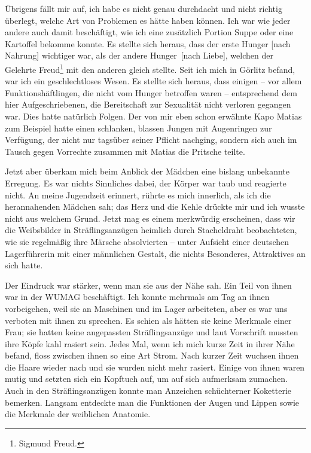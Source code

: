 \documentclass[a4paper,12pt,ngerman,
]{nisebook}
\begin{document}
Übrigens fällt mir auf, ich habe es nicht genau durchdacht und nicht richtig überlegt, welche Art von Problemen es hätte haben können. Ich war wie jeder andere auch damit beschäftigt, wie ich eine zusätzlich Portion Suppe oder eine Kartoffel bekomme konnte. Es stellte sich heraus, dass der erste Hunger [nach Nahrung] wichtiger war, als der andere \glqq Hunger\grqq~[nach Liebe], welchen der Gelehrte Freud\footnote{Sigmund Freud.} mit den anderen gleich stellte. Seit ich mich in Görlitz befand, war ich ein geschlechtloses Wesen. Es stellte sich heraus, dass einigen -- vor allem Funktionshäftlingen, die nicht vom Hunger betroffen waren -- entsprechend dem hier Aufgeschriebenen, die Bereitschaft zur Sexualität nicht verloren gegangen war. Dies hatte natürlich Folgen. Der von mir eben schon erwähnte Kapo Matias zum Beispiel hatte einen schlanken, blassen Jungen mit Augenringen zur Verfügung, der nicht nur tagsüber seiner Pflicht nachging, sondern sich auch im Tausch gegen Vorrechte zusammen mit Matias die Pritsche teilte.

Jetzt aber überkam mich beim Anblick der Mädchen eine bislang unbekannte Erregung. Es war nichts Sinnliches dabei, der Körper war taub und reagierte nicht. An meine Jugendzeit erinnert, rührte es mich innerlich, als ich die herannahenden Mädchen sah; das Herz und die Kehle drückte mir und ich wusste nicht aus welchem Grund. Jetzt mag es einem merkwürdig erscheinen, dass wir die Weibsbilder in Sträflingsanzügen heimlich durch Stacheldraht beobachteten, wie sie regelmäßig ihre Märsche absolvierten -- unter Aufsicht einer deutschen Lagerführerin mit einer männlichen Gestalt, die nichts Besonderes, Attraktives an sich hatte.

Der Eindruck war stärker, wenn man sie aus der Nähe sah. Ein Teil von ihnen war in der WUMAG beschäftigt. Ich konnte mehrmals am Tag an ihnen vorbeigehen, weil sie an Maschinen und im Lager arbeiteten, aber es war uns verboten mit ihnen zu sprechen. Es schien als hätten sie keine Merkmale einer Frau; sie hatten keine angepassten Sträflingsanzüge und laut Vorschrift mussten ihre Köpfe kahl rasiert sein. Jedes Mal, wenn ich mich kurze Zeit in ihrer Nähe befand, floss zwischen ihnen so eine Art Strom. Nach kurzer Zeit wuchsen ihnen die Haare wieder nach und sie wurden nicht mehr rasiert. Einige von ihnen waren mutig und setzten sich ein Kopftuch auf, um auf sich aufmerksam zumachen. Auch in den Sträflingsanzügen konnte man Anzeichen schüchterner Koketterie bemerken. Langsam entdeckte man die Funktionen der Augen und Lippen sowie die Merkmale der weiblichen Anatomie.
\end{document}
